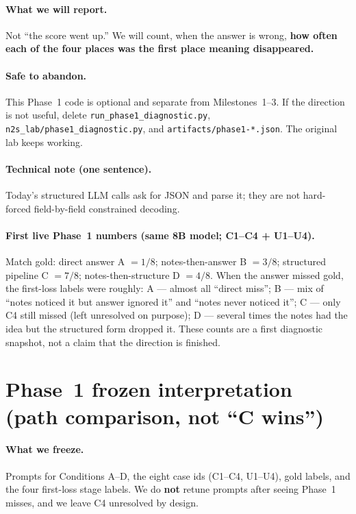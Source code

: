 \documentclass[11pt,a4paper]{article}
\begin{document}
\paragraph{What we will report.}
Not ``the score went up.'' We will count, when the answer is wrong, \textbf{how often each of the four places was the first place meaning disappeared.}

\paragraph{Safe to abandon.}
This Phase~1 code is optional and separate from Milestones~1--3.
If the direction is not useful, delete \texttt{run\_phase1\_diagnostic.py}, \texttt{n2s\_lab/phase1\_diagnostic.py}, and \texttt{artifacts/phase1-*.json}. The original lab keeps working.

\paragraph{Technical note (one sentence).}
Today's structured LLM calls ask for JSON and parse it; they are not hard-forced field-by-field constrained decoding.

\paragraph{First live Phase~1 numbers (same 8B model; C1--C4 + U1--U4).}
Match gold: direct answer A $=1/8$; notes-then-answer B $=3/8$; structured pipeline C $=7/8$; notes-then-structure D $=4/8$.
When the answer missed gold, the first-loss labels were roughly:
A --- almost all ``direct miss'';
B --- mix of ``notes noticed it but answer ignored it'' and ``notes never noticed it'';
C --- only C4 still missed (left unresolved on purpose);
D --- several times the notes had the idea but the structured form dropped it.
These counts are a first diagnostic snapshot, not a claim that the direction is finished.

\section{Phase~1 frozen interpretation (path comparison, not ``C wins'')}

\paragraph{What we freeze.}
Prompts for Conditions A--D, the eight case ids (C1--C4, U1--U4), gold labels, and the four first-loss stage labels.
We do \textbf{not} retune prompts after seeing Phase~1 misses, and we leave C4 unresolved by design.
\end{document}
